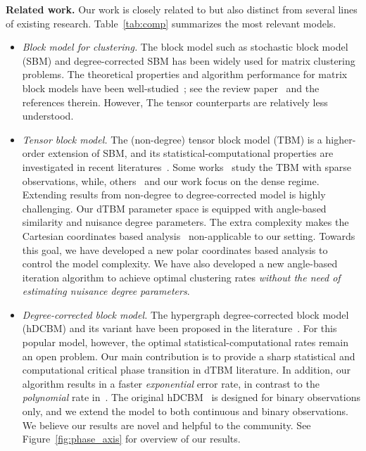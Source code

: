 \documentclass[journal]{IEEEtran}
\theoremstyle{definition}
\theoremstyle{definition}
\begin{document}
{\bf Related work.} 
Our work is closely related to but also distinct from several lines of existing research. Table~\ref{tab:comp} summarizes the most relevant models. 

\begin{itemize}[wide]
    \item \textit{Block model for clustering.} The block model such as stochastic block model (SBM) and degree-corrected SBM has been widely used for matrix clustering problems. The theoretical properties and algorithm performance for matrix block models have been well-studied~\citep{gao2018community}; see the review paper~\citep{abbe2017community} and the references therein. However, The tensor counterparts are relatively less understood. 
    
    \item  \textit{Tensor block model.} The (non-degree) tensor block model (TBM) is a higher-order extension of SBM, and its statistical-computational properties are investigated in recent literatures~\citep{wang2019multiway, han2020exact, ghoshdastidar2017consistency}. Some works~\citep{ahn2018hypergraph} study the TBM with sparse observations, while, others~\citep{wang2019multiway, han2020exact} and our work focus on the dense regime. Extending results from non-degree to degree-corrected model is highly challenging. Our dTBM parameter space is equipped with angle-based similarity and nuisance degree parameters. The extra complexity makes the Cartesian coordinates based analysis~\citep{han2020exact} non-applicable to our setting. Towards this goal, we have developed a new polar coordinates based analysis to control the model complexity. We have also developed a new angle-based iteration algorithm to achieve optimal clustering rates \emph{without the need of estimating nuisance degree parameters}.
    
    
    \item \textit{Degree-corrected block model.} The hypergraph degree-corrected block model (hDCBM) and its variant have been proposed in the literature~\citep{ke2019community, yuan2022testing}. For this popular model, however, the optimal statistical-computational rates remain an open problem. Our main contribution is to provide a sharp statistical and computational critical phase transition in dTBM literature. In addition, our algorithm results in a faster \emph{exponential} error rate, in contrast to the \emph{polynomial} rate in~\cite{ke2019community}. The original hDCBM~\citep{ke2019community} is designed for binary observations only, and we extend the model to both continuous and binary observations. We believe our results are novel and helpful to the community. See Figure~\ref{fig:phase_axis} for overview of our results. 
    

\end{itemize}
\end{document}
